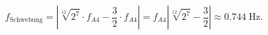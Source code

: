 \begin{equation}
    f_\text{Schwebung}
    =
    \left| \sqrt[12]{2^{7}} \cdot f_{A4} - \frac{3}{2} \cdot f_{A4} \right|
    =
    f_{A4} \left| \sqrt[12]{2^{7}} - \frac{3}{2} \right|
    \approx
    0.744\;\text{Hz}. 
\end{equation}
